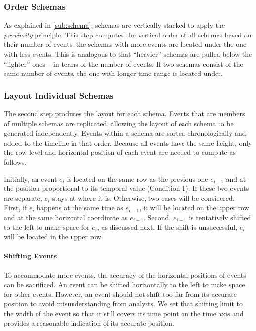 \subsubsection{Order Schemas}
As explained in \autoref{sub:schema}, schemas are vertically stacked to apply the \emph{proximity} principle. This step computes the vertical order of all schemas based on their number of events: the schemas with more events are located under the one with less events. This is analogous to that ``heavier'' schemas are pulled below the ``lighter'' ones -- in terms of the number of events. If two schemas consist of the same number of events, the one with longer time range is located under.

\subsubsection{Layout Individual Schemas}
\label{sub:layout-schema}
The second step produces the layout for each schema. Events that are members of multiple schemas are replicated, allowing the layout of each schema to be generated independently. Events within a schema are sorted chronologically and added to the timeline in that order. Because all events have the same height, only the row level and horizontal position of each event are needed to compute as follows.

Initially, an event $e_i$ is located on the same row as the previous one $e_{i-1}$ and at the position proportional to its temporal value (Condition 1). If these two events are separate, $e_i$ stays at where it is. Otherwise, two cases will be considered. First, if $e_i$ happens at the same time as $e_{i-1}$, it will be located on the upper row and at the same horizontal coordinate as $e_{i-1}$. Second, $e_{i-1}$ is tentatively shifted to the left to make space for $e_i$, as discussed next. If the shift is unsuccessful, $e_i$ will be located in the upper row.

\paragraph*{Shifting Events}
To accommodate more events, the accuracy of the horizontal positions of events can be sacrificed. An event can be shifted horizontally to the left to make space for other events. However, an event should not shift too far from its accurate position to avoid misunderstanding from analysts. We set that shifting limit to the width of the event so that it still covers its time point on the time axis and provides a reasonable indication of its accurate position. 

